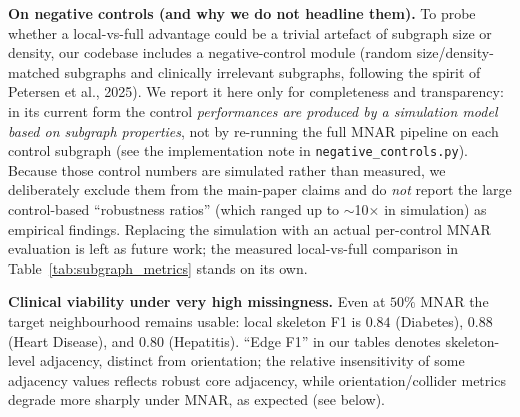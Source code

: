 \documentclass[runningheads]{llncs}
\begin{document}
\textbf{On negative controls (and why we do not headline them).} To probe whether a local-vs-full advantage could be a trivial artefact of subgraph size or density, our codebase includes a negative-control module (random size/density-matched subgraphs and clinically irrelevant subgraphs, following the spirit of Petersen et al., 2025). We report it here only for completeness and transparency: in its current form the control \emph{performances are produced by a simulation model based on subgraph properties}, not by re-running the full MNAR pipeline on each control subgraph (see the implementation note in \texttt{negative\_controls.py}). Because those control numbers are simulated rather than measured, we deliberately exclude them from the main-paper claims and do \emph{not} report the large control-based ``robustness ratios'' (which ranged up to $\sim$10$\times$ in simulation) as empirical findings. Replacing the simulation with an actual per-control MNAR evaluation is left as future work; the measured local-vs-full comparison in Table~\ref{tab:subgraph_metrics} stands on its own.

\textbf{Clinical viability under very high missingness.} Even at $50\%$ MNAR the target neighbourhood remains usable: local skeleton F1 is $0.84$ (Diabetes), $0.88$ (Heart Disease), and $0.80$ (Hepatitis). ``Edge F1'' in our tables denotes skeleton-level adjacency, distinct from orientation; the relative insensitivity of some adjacency values reflects robust core adjacency, while orientation/collider metrics degrade more sharply under MNAR, as expected (see below).
\end{document}
